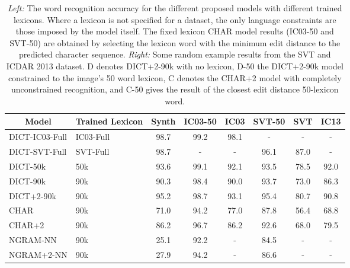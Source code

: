 \documentclass{article} \usepackage{nips14submit_e,times}
\begin{document}
\begin{table}[t]
\begin{center}\scriptsize \setlength{\tabcolsep}{3pt}
\begin{tabular}[t]{|l|l||c|c|c|c|c|c|} 
\hline
\multicolumn{1}{|c|}{\centering Model} & 
\multicolumn{1}{p{1.0cm}||}{\centering Trained Lexicon} &
\multicolumn{1}{p{1.2cm}|}{\centering Synth} &
\multicolumn{1}{c|}{\centering IC03-50} &
\multicolumn{1}{c|}{\centering IC03} &
\multicolumn{1}{c|}{\centering SVT-50} &
\multicolumn{1}{c|}{\centering SVT} &
\multicolumn{1}{c|}{\centering IC13}
\\
\hline\hline
DICT-IC03-Full & IC03-Full & 98.7 & 99.2 &  98.1 & - & - & - \\
\rowcolor{Gray}
DICT-SVT-Full & SVT-Full  & 98.7 & - & - & 96.1 & 87.0 & -\\
DICT-50k & 50k       & 93.6 & 99.1 & 92.1 & 93.5 & 78.5 & 92.0 \\ 
\rowcolor{Gray}
DICT-90k & 90k       & 90.3 & 98.4 & 90.0 & 93.7 & 73.0 & 86.3 \\ 
DICT+2-90k & 90k     & 95.2 & 98.7 & 93.1 & 95.4 & 80.7 & 90.8 \\
\rowcolor{Gray}
CHAR & 90k       & 71.0 & 94.2 & 77.0 & 87.8 & 56.4 & 68.8 \\ 
CHAR+2 & 90k     & 86.2 & 96.7 & 86.2 & 92.6 & 68.0 & 79.5 \\
\rowcolor{Gray}
NGRAM-NN & 90k      & 25.1 & 92.2 & - & 84.5 & - & -\\
NGRAM+2-NN & 90k    & 27.9 & 94.2 & - & 86.6 & - & - \\
\hline
\end{tabular}
\qquad\quad
{}\end{center}
\vspace*{-1em}
\caption{\small \emph{Left:} The word recognition accuracy for the different proposed models with different trained lexicons. Where a lexicon is not specified for a dataset, the only language constraints are those imposed by the model itself. The fixed lexicon CHAR model results (IC03-50 and SVT-50) are obtained by selecting the lexicon word with the minimum edit distance to the predicted character sequence. 
\emph{Right:} Some random example results from the SVT and ICDAR 2013 dataset. D denotes DICT+2-90k with no lexicon, D-50 the DICT+2-90k model constrained to the image's 50 word lexicon, C denotes the CHAR+2 model with completely unconstrained recognition, and C-50 gives the result of the closest edit distance 50-lexicon word.} 
\label{table:internal}
\end{table}
\end{document}
